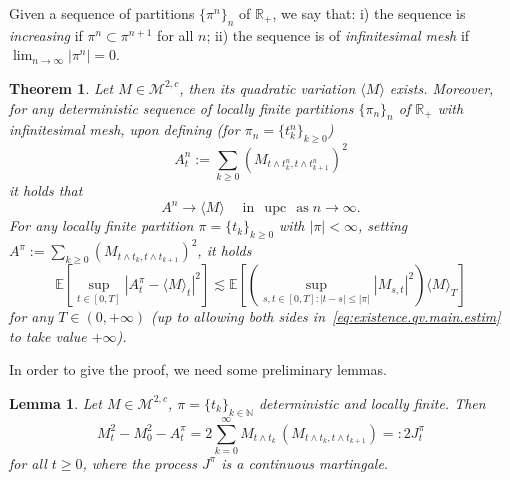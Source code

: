 \documentclass{article}
\newcommand{\coloneq}{:=}
\newcommand{\eqqcolon}{=:}
\newcommand{\emph}[1]{{\em #1\/}}
\newcommand{\tmop}[1]{\ensuremath{\operatorname{#1}}}
\newtheorem{lemma}{Lemma}
\newtheorem{theorem}{Theorem}
\newcommand{\1}{\1}
\begin{document}
{Given a sequence of partitions $\{ \pi^n \}_n$ of $\mathbb{R}_+$, we say that:
i) the sequence is {\emph{increasing}} if $\pi^n \subset \pi^{n + 1}$ for all
$n$; ii) the sequence is of {\emph{infinitesimal mesh}} if $\lim_{n
\rightarrow \infty} | \pi^n | = 0$.

\begin{theorem}
  \label{thm:quadratic.variation.existence}Let $M \in \mathcal{M}^{2, c}$,
  then its quadratic variation $\langle M \rangle$ exists. Moreover, for any
  deterministic sequence of locally finite partitions $\{ \pi_n \}_n$ of
  $\mathbb{R}_+$ with infinitesimal mesh, upon defining (for $\pi_n = \{ t^n_k
  \}_{k \geqslant 0}$)
  \[ A^n_t \coloneq \sum_{k \geqslant 0} (M_{t \wedge t^n_k, t \wedge t^n_{k +
     1}})^2 \]
  it holds that
  \begin{equation}
    A^n \rightarrow \langle M \rangle \quad \operatorname{in} \, \tmop{upc} \,
    \operatorname{as} n \rightarrow \infty . \label{eq:existence.qv.upc}
  \end{equation}
  For any locally finite partition $\pi = \{ t_k \}_{k \geqslant 0}$ with $|
  \pi | < \infty$, setting $A^{\pi} \coloneq \sum_{k \geqslant 0} (M_{t \wedge
  t_k, t \wedge t_{k + 1}})^2$, it holds
  \begin{equation}
    \mathbb{E} [\sup_{t \in [0, T]} | A^{\pi}_t - \langle M \rangle_t |^2]
    \lesssim \mathbb{E} [(\sup_{s, t \in [0, T] : | t - s | \leqslant | \pi |}
    | M_{s, t} |^2) \langle M \rangle_T] \label{eq:existence.qv.main.estim}
  \end{equation}
  for any $T \in (0, + \infty)$ (up to allowing both sides
  in~\eqref{eq:existence.qv.main.estim} to take value $+ \infty$).
\end{theorem}

In order to give the proof, we need some preliminary lemmas.

\begin{lemma}
  \label{lem:quadratic.existence.lemma1}Let $M \in \mathcal{M}^{2, c}$, $\pi =
  \{ t_k \}_{k \in \mathbb{N}}$ deterministic and locally finite. Then
  \begin{equation}
    M^2_t - M^2_0 - A^{\pi}_t = 2 \sum_{k = 0}^{\infty} M_{t \wedge t_k} \,
    (M_{t \wedge t_k, t \wedge t_{k + 1}}) \eqqcolon 2 J^{\pi}_t
    \label{eq:quadratic.existence.lemma1}
  \end{equation}
  for all $t \geqslant 0$, where the process $J^{\pi}$ is a continuous
  martingale.
\end{lemma}

}
\end{document}
